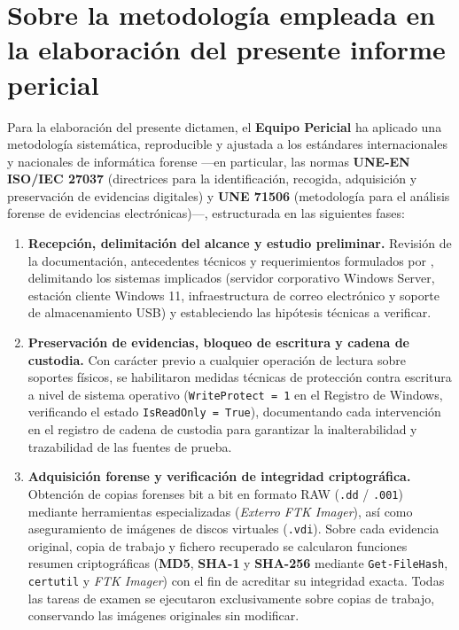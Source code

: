 \section{Sobre la metodología empleada en la elaboración del presente informe pericial}

Para la elaboración del presente dictamen, el \textbf{Equipo Pericial \GrupoPracticas} ha aplicado una metodología sistemática, reproducible y ajustada a los estándares internacionales y nacionales de informática forense —en particular, las normas \textbf{UNE-EN ISO/IEC 27037} (directrices para la identificación, recogida, adquisición y preservación de evidencias digitales) y \textbf{UNE 71506} (metodología para el análisis forense de evidencias electrónicas)—, estructurada en las siguientes fases:

\begin{enumerate}[leftmargin=1.6em, itemsep=0.65em]
	\item \textbf{Recepción, delimitación del alcance y estudio preliminar.}
	Revisión de la documentación, antecedentes técnicos y requerimientos formulados por \Cliente, delimitando los sistemas implicados (servidor corporativo Windows Server, estación cliente Windows 11, infraestructura de correo electrónico y soporte de almacenamiento USB) y estableciendo las hipótesis técnicas a verificar.
	
	\item \textbf{Preservación de evidencias, bloqueo de escritura y cadena de custodia.}
	Con carácter previo a cualquier operación de lectura sobre soportes físicos, se habilitaron medidas técnicas de protección contra escritura a nivel de sistema operativo (\texttt{WriteProtect = 1} en el Registro de Windows, verificando el estado \texttt{IsReadOnly = True}), documentando cada intervención en el registro de cadena de custodia para garantizar la inalterabilidad y trazabilidad de las fuentes de prueba.
	
	\item \textbf{Adquisición forense y verificación de integridad criptográfica.}
	Obtención de copias forenses bit a bit en formato RAW (\texttt{.dd} / \texttt{.001}) mediante herramientas especializadas (\textit{Exterro FTK Imager}), así como aseguramiento de imágenes de discos virtuales (\texttt{.vdi}). Sobre cada evidencia original, copia de trabajo y fichero recuperado se calcularon funciones resumen criptográficas (\textbf{MD5}, \textbf{SHA-1} y \textbf{SHA-256} mediante \texttt{Get-FileHash}, \texttt{certutil} y \textit{FTK Imager}) con el fin de acreditar su integridad exacta. Todas las tareas de examen se ejecutaron exclusivamente sobre copias de trabajo, conservando las imágenes originales sin modificar.
	

\end{enumerate}
